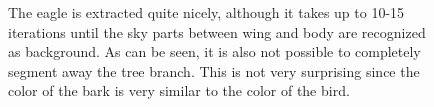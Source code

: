 \documentclass[11pt,a4paper]{article}
\begin{document}
\begin{figure}
\centering
{}
\quad
{}

\caption{The eagle is extracted quite nicely, although it takes up to 10-15 iterations until the sky parts between wing and body are recognized as background. As can be seen, it is also not possible to completely segment away the tree branch. This is not very surprising since the color of the bark is very similar to the color of the bird.}%

\end{figure}
\end{document}
